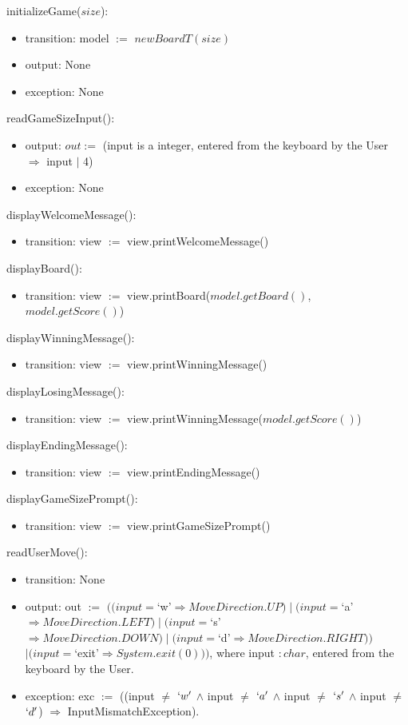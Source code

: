 \documentclass[12pt]{article}
\begin{document}
\noindent initializeGame($size$):
\begin{itemize}
  \item transition: model $:=$ $new BoardT(size)$
  \item output: None
  \item exception: None
\end{itemize}

\noindent readGameSizeInput():
\begin{itemize}
  \item output: $out :=$ (input is a integer, entered from the keyboard by the User $\Rightarrow$ input $\mid$ 4)
  \item exception: None
\end{itemize}

\noindent displayWelcomeMessage():
\begin{itemize}
  \item transition: view $:=$ view.printWelcomeMessage()
\end{itemize}

\noindent displayBoard():
\begin{itemize}
  \item transition: view $:=$ view.printBoard($model.getBoard()$, $model.getScore()$)
\end{itemize}

\noindent displayWinningMessage():
\begin{itemize}
  \item transition: view $:=$ view.printWinningMessage()
\end{itemize}

\noindent displayLosingMessage():
\begin{itemize}
  \item transition: view $:=$ view.printWinningMessage($model.getScore()$)
\end{itemize}

\noindent displayEndingMessage():
\begin{itemize}
  \item transition: view $:=$ view.printEndingMessage()
\end{itemize}

\noindent displayGameSizePrompt():
\begin{itemize}
  \item transition: view $:=$ view.printGameSizePrompt()
\end{itemize}

\noindent readUserMove():
\begin{itemize}
  \item transition: None
  \item output: out $:=$ $((input = $`w'$ \Rightarrow MoveDirection.UP) \mid  (input = $`a'$ \Rightarrow MoveDirection.LEFT) \mid  (input = $`s'$ \Rightarrow MoveDirection.DOWN) \mid  (input = $`d'$ \Rightarrow MoveDirection.RIGHT))$ $\mid  (input = $`exit'$ \Rightarrow System.exit(0)))$, where input $: char$, entered from the keyboard by the User.
  \item exception: exc $:=$ ((input $\neq$ $`w'$ $\land$ input $\neq$ $`a'$ $\land$ input $\neq$ $`s'$ $\land$ input $\neq$ $`d'$) $\Rightarrow$ InputMismatchException).
\end{itemize}
\end{document}
